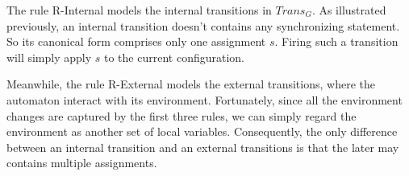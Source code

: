 The rule R-Internal models the internal transitions in $Trans_G$. As illustrated previously, an internal transition doesn't contains any synchronizing statement. So its canonical form comprises only one assignment $s$. Firing such a transition will simply apply $s$ to the current configuration.

Meanwhile, the rule R-External models the external transitions, where the automaton interact with its environment. Fortunately, since all the environment changes are captured by the first three rules, we can simply regard the environment as another set of local variables. Consequently, the only difference between an internal transition and an external transitions is that the later may contains multiple assignments.
